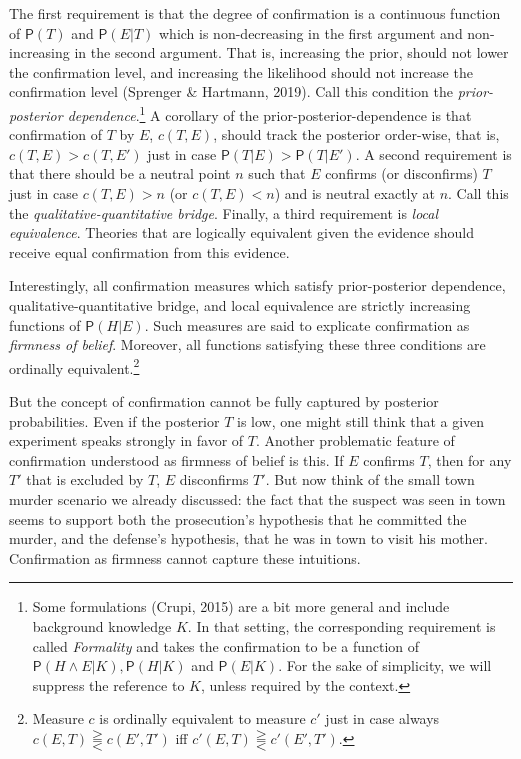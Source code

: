 \documentclass[
  letterpaper,
  DIV=11,
  numbers=noendperiod]{scrartcl}
\newcommand{\et}{\wedge}
\newcommand{\pr}[1]{\mathsf{P}(#1)}
\begin{document}
The first requirement is that the degree of confirmation is a continuous
function of \(\pr{T}\) and \(\pr{E\vert T}\) which is non-decreasing in
the first argument and non-increasing in the second argument. That is,
increasing the prior, should not lower the confirmation level, and
increasing the likelihood should not increase the confirmation level
(Sprenger \& Hartmann, 2019). Call this condition the
\emph{prior-posterior dependence}.\footnote{Some formulations (Crupi,
  2015) are a bit more general and include background knowledge \(K\).
  In that setting, the corresponding requirement is called
  \emph{Formality} and takes the confirmation to be a function of
  \(\pr{H \et E \vert K}, \pr{H\vert K}\) and \(\pr{E\vert K}\). For the
  sake of simplicity, we will suppress the reference to \(K\), unless
  required by the context.} A corollary of the
prior-posterior-dependence is that confirmation of \(T\) by \(E\),
\(c(T,E)\), should track the posterior order-wise, that is,
\(c(T,E)>c(T,E')\) just in case \(\pr{T\vert E} > \pr{T\vert E'}\). A
second requirement is that there should be a neutral point \(n\) such
that \(E\) confirms (or disconfirms) \(T\) just in case \(c(T,E)>n\) (or
\(c(T,E)<n\)) and is neutral exactly at \(n\). Call this the
\emph{qualitative-quantitative bridge}. Finally, a third requirement is
\emph{local equivalence}. Theories that are logically equivalent given
the evidence should receive equal confirmation from this evidence.

Interestingly, all confirmation measures which satisfy prior-posterior
dependence, qualitative-quantitative bridge, and local equivalence are
strictly increasing functions of \(\pr{H \vert E}\). Such measures are
said to explicate confirmation as \emph{firmness of belief}. Moreover,
all functions satisfying these three conditions are ordinally
equivalent.\footnote{Measure $c$ is ordinally equivalent to measure $c'$ just in case always $c(E , T) \gtreqqless c(E', T')$ iff $c'(E , T) \gtreqqless c'(E' , T')$.}

But the concept of confirmation cannot be fully captured by posterior
probabilities. Even if the posterior \(T\) is low, one might still think
that a given experiment speaks strongly in favor of \(T\). Another
problematic feature of confirmation understood as firmness of belief is
this. If \(E\) confirms \(T\), then for any \(T'\) that is excluded by
\(T\), \(E\) disconfirms \(T'\). But now think of the small town murder
scenario we already discussed: the fact that the suspect was seen in
town seems to support both the prosecution's hypothesis that he
committed the murder, and the defense's hypothesis, that he was in town
to visit his mother. Confirmation as firmness cannot capture these
intuitions.
\end{document}
